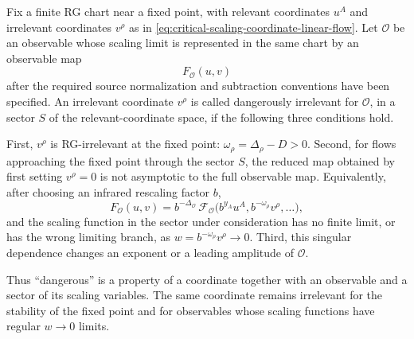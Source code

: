 \begin{definition}
Fix a finite RG chart near a fixed point, with relevant coordinates \(u^A\)
and irrelevant coordinates \(v^\rho\) as in
\eqref{eq:critical-scaling-coordinate-linear-flow}.  Let
\({\mathcal O}\) be an observable whose scaling limit is represented in the
same chart by an observable map
\[
  F_{\mathcal O}(u,v)
\]
after the required source normalization and subtraction conventions have been
specified.  An irrelevant coordinate \(v^\rho\) is called dangerously
irrelevant for \({\mathcal O}\), in a sector \(S\) of the relevant-coordinate
space, if the following three conditions hold.

First, \(v^\rho\) is RG-irrelevant at the fixed point:
\(\omega_\rho=\Delta_\rho-D>0\).  Second, for flows approaching the fixed
point through the sector \(S\), the reduced map obtained by first setting
\(v^\rho=0\) is not asymptotic to the full observable map.  Equivalently,
after choosing an infrared rescaling factor \(b\),
\begin{equation}
  F_{\mathcal O}(u,v)
  =
  b^{-\Delta_{\mathcal O}}\,
  {\mathcal F}_{\mathcal O}
  \bigl(b^{y_A}u^A,b^{-\omega_\rho}v^\rho,\ldots\bigr),
  \label{eq:dangerously-irrelevant-scaling-form}
\end{equation}
and the scaling function in the sector under consideration has no finite
limit, or has the wrong limiting branch, as
\(w=b^{-\omega_\rho}v^\rho\to0\).  Third, this singular dependence changes
an exponent or a leading amplitude of \({\mathcal O}\).
\end{definition}

Thus ``dangerous'' is a property of a coordinate together with an observable
and a sector of its scaling variables.  The same coordinate remains irrelevant
for the stability of the fixed point and for observables whose scaling
functions have regular \(w\to0\) limits.

